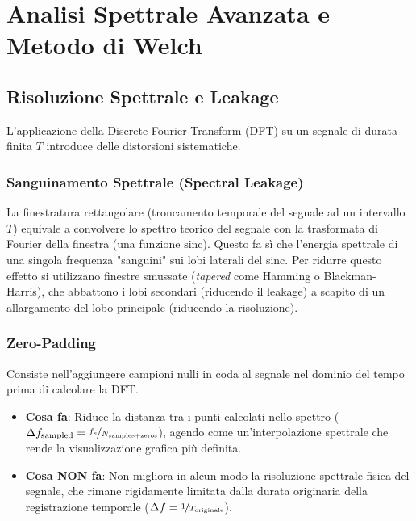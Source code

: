 \documentclass[10pt, letterpaper]{report}
\begin{document}
\chapter{Analisi Spettrale Avanzata e Metodo di Welch}

\section{Risoluzione Spettrale e Leakage}
L'applicazione della Discrete Fourier Transform (DFT) su un segnale di durata finita $T$ introduce delle distorsioni sistematiche.

\subsection{Sanguinamento Spettrale (Spectral Leakage)}
La finestratura rettangolare (troncamento temporale del segnale ad un intervallo $T$) equivale a convolvere lo spettro teorico del segnale con la trasformata di Fourier della finestra (una funzione $\text{sinc}$).
Questo fa sì che l'energia spettrale di una singola frequenza "sanguini" sui lobi laterali del sinc.
Per ridurre questo effetto si utilizzano finestre smussate (\emph{tapered} come Hamming o Blackman-Harris), che abbattono i lobi secondari (riducendo il leakage) a scapito di un allargamento del lobo principale (riducendo la risoluzione).

\subsection{Zero-Padding}
Consiste nell'aggiungere campioni nulli in coda al segnale nel dominio del tempo prima di calcolare la DFT.
\begin{itemize}
    \item \textbf{Cosa fa}: Riduce la distanza tra i punti calcolati nello spettro ($\Delta f_{\text{sampled}} = \nicefrac{f_s}{N_{\text{samples} + \text{zeros}}}$), agendo come un'interpolazione spettrale che rende la visualizzazione grafica più definita.
    \item \textbf{Cosa NON fa}: Non migliora in alcun modo la risoluzione spettrale fisica del segnale, che rimane rigidamente limitata dalla durata originaria della registrazione temporale ($\Delta f = \nicefrac{1}{T_{\text{originale}}}$).
\end{itemize}
\end{document}
